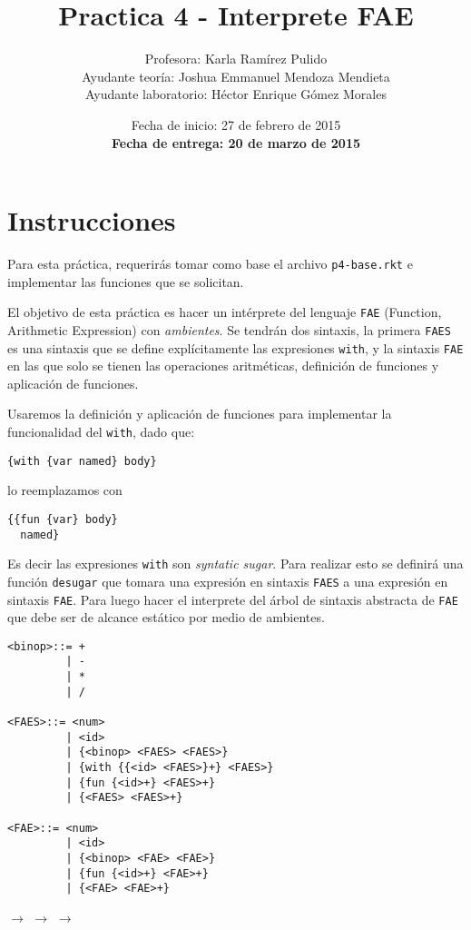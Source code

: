 \documentclass{article}
\author{Profesora: Karla Ramírez Pulido\\
  Ayudante teoría: Joshua Emmanuel Mendoza Mendieta\\
  Ayudante laboratorio: Héctor Enrique Gómez Morales}
\title{Practica 4 - Interprete FAE}
\date{Fecha de inicio: 27 de febrero de 2015\\
  \textbf{Fecha de entrega: 20 de marzo de 2015}}
\begin{document}
\maketitle
\section{Instrucciones}

Para esta práctica, requerirás tomar como base el archivo \texttt{p4-base.rkt} e implementar las funciones que se solicitan.

El objetivo de esta práctica es hacer un intérprete del lenguaje \texttt{FAE} (Function, Arithmetic Expression) con \emph{ambientes}. Se tendrán dos sintaxis, la primera \texttt{FAES} es una sintaxis que se define explícitamente las expresiones \texttt{with}, y la sintaxis \texttt{FAE} en las que solo se tienen las operaciones aritméticas, definición de funciones y aplicación de funciones.

Usaremos la definición y aplicación de funciones para implementar la funcionalidad del \texttt{with}, dado que:
\begin{verbatim}
{with {var named} body}

\end{verbatim}

lo reemplazamos con

\begin{verbatim}
{{fun {var} body}
  named}
\end{verbatim}

Es decir las expresiones \texttt{with} son \emph{syntatic sugar}. Para realizar esto se definirá una función \texttt{desugar} que tomara una expresión en sintaxis \texttt{FAES} a una expresión en sintaxis \texttt{FAE}. Para luego hacer el interprete del árbol de sintaxis abstracta de \texttt{FAE} que debe ser de alcance estático por medio de ambientes.

\begin{verbatim}
<binop>::= +
         | -
         | *
         | /

<FAES>::= <num>
         | <id>
         | {<binop> <FAES> <FAES>}
         | {with {{<id> <FAES>}+} <FAES>}
         | {fun {<id>+} <FAES>+}
         | {<FAES> <FAES>+}

<FAE>::= <num>
         | <id>
         | {<binop> <FAE> <FAE>}
         | {fun {<id>+} <FAE>+}
         | {<FAE> <FAE>+}
\end{verbatim}

\begin{center}
 $\rightarrow$
 $\rightarrow$
 $\rightarrow$
\end{center}
\end{document}
